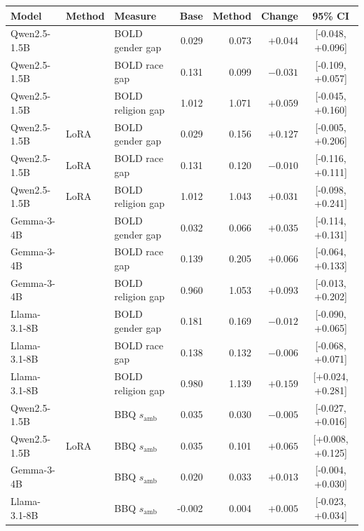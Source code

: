   \footnotesize\setlength{\tabcolsep}{4pt}
  \begin{tabular}{@{}lllrrrc@{}}
    \toprule
    Model & Method & Measure & Base & Method & Change & 95\% CI \\
    \midrule
    Qwen2.5-1.5B & \PEAT{} & BOLD gender gap & 0.029 & 0.073 & $+0.044$ & [-0.048, +0.096] \\
    Qwen2.5-1.5B & \PEAT{} & BOLD race gap & 0.131 & 0.099 & $-0.031$ & [-0.109, +0.057] \\
    Qwen2.5-1.5B & \PEAT{} & BOLD religion gap & 1.012 & 1.071 & $+0.059$ & [-0.045, +0.160] \\
    Qwen2.5-1.5B & LoRA & BOLD gender gap & 0.029 & 0.156 & $+0.127$ & [-0.005, +0.206] \\
    Qwen2.5-1.5B & LoRA & BOLD race gap & 0.131 & 0.120 & $-0.010$ & [-0.116, +0.111] \\
    Qwen2.5-1.5B & LoRA & BOLD religion gap & 1.012 & 1.043 & $+0.031$ & [-0.098, +0.241] \\
    Gemma-3-4B & \PEAT{} & BOLD gender gap & 0.032 & 0.066 & $+0.035$ & [-0.114, +0.131] \\
    Gemma-3-4B & \PEAT{} & BOLD race gap & 0.139 & 0.205 & $+0.066$ & [-0.064, +0.133] \\
    Gemma-3-4B & \PEAT{} & BOLD religion gap & 0.960 & 1.053 & $+0.093$ & [-0.013, +0.202] \\
    Llama-3.1-8B & \PEAT{} & BOLD gender gap & 0.181 & 0.169 & $-0.012$ & [-0.090, +0.065] \\
    Llama-3.1-8B & \PEAT{} & BOLD race gap & 0.138 & 0.132 & $-0.006$ & [-0.068, +0.071] \\
    Llama-3.1-8B & \PEAT{} & BOLD religion gap & 0.980 & 1.139 & $+0.159$ & [+0.024, +0.281] \\
    Qwen2.5-1.5B & \PEAT{} & BBQ $s_{\mathrm{amb}}$ & 0.035 & 0.030 & $-0.005$ & [-0.027, +0.016] \\
    Qwen2.5-1.5B & LoRA & BBQ $s_{\mathrm{amb}}$ & 0.035 & 0.101 & $+0.065$ & [+0.008, +0.125] \\
    Gemma-3-4B & \PEAT{} & BBQ $s_{\mathrm{amb}}$ & 0.020 & 0.033 & $+0.013$ & [-0.004, +0.030] \\
    Llama-3.1-8B & \PEAT{} & BBQ $s_{\mathrm{amb}}$ & -0.002 & 0.004 & $+0.005$ & [-0.023, +0.034] \\
    \bottomrule
  \end{tabular}
